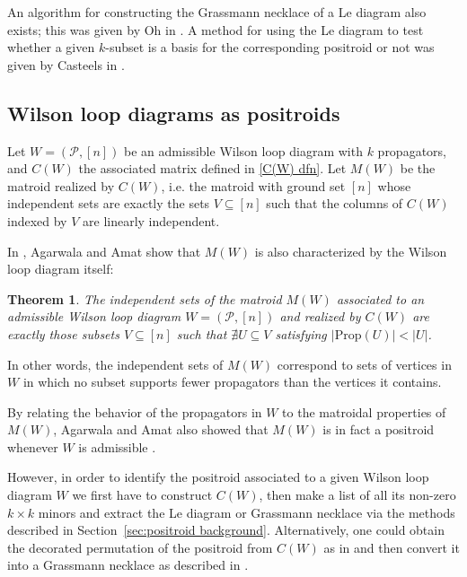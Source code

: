 \documentclass[11pt]{article}
\newcommand{\hlfix}[2]{\texthl{#1}\todo{#2}}
\newcommand{\cP}{\mathcal{P}}
\newcommand{\Prop}{\textrm{Prop}}
\newtheorem{thm}{Theorem}[section]
\theoremstyle{remark}
\theoremstyle{definition}
\begin{document}
An algorithm for constructing the Grassmann necklace of a Le diagram also exists; this was given by Oh in \cite{Oh}. A method for using the Le diagram to test whether a given $k$-subset is a basis for the corresponding positroid or not was given by Casteels in \cite{CasteelsPaths}.



\subsection{Wilson loop diagrams as positroids}\label{sec:WLD as positroids}


Let $W = (\cP,[n])$ be an admissible Wilson loop diagram with $k$ propagators, and $C(W)$ the associated matrix defined in \eqref{C(W) dfn}. Let $M(W)$ be the matroid realized by $C(W)$, i.e. the matroid with ground set $[n]$ whose independent sets are exactly the sets $V \subseteq [n]$ such that the columns of $C(W)$ indexed by $V$ are linearly independent.

In \cite{wilsonloop}, Agarwala and Amat show that $M(W)$ is also characterized by the Wilson loop diagram itself:

\begin{thm} \label{thm WLD defines matroid} \cite[Theorem 3.6]{wilsonloop} The independent sets of the matroid $M(W)$ associated to an admissible Wilson loop diagram $W = (\cP,[n])$ and realized by $C(W)$ are exactly those subsets $V \subseteq [n]$ such that $\nexists U\subseteq V$ satisfying $|\Prop(U)| < |U|$. \end{thm}
In other words, the independent sets of $M(W)$ correspond to sets of vertices in $W$ in which no subset supports fewer propagators than the vertices it contains.

By relating the behavior of the propagators in $W$ to the matroidal properties of $M(W)$, Agarwala and Amat also showed that $M(W)$ is in fact a positroid whenever $W$ is admissible \cite[Corollary 3.39]{wilsonloop}.

However, in order to identify the positroid associated to a given Wilson loop diagram $W$ we first have to construct $C(W)$, then make a list of all its non-zero $k\times k$ minors and extract the Le diagram or Grassmann necklace via the methods described in Section~\ref{sec:positroid background}. Alternatively, one could obtain the decorated permutation of the positroid from $C(W)$ as in \hlfix{[ref]}{Sian needs to go find this reference} and then convert it into a Grassmann necklace as described in \cite[Section 16]{Postnikov}. 
\end{document}
